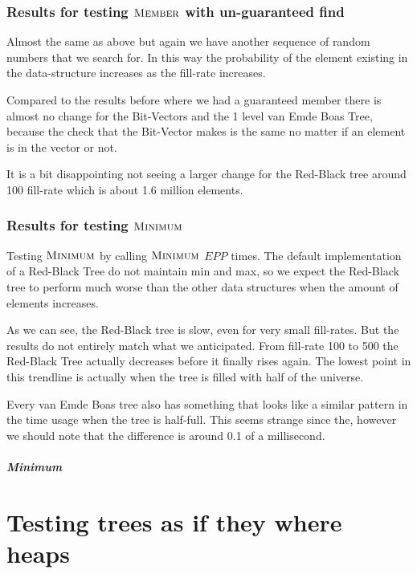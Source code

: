 \documentclass[oneside,11pt,openright]{report}
\newcommand{\Member}{\textsc{Member}}
\newcommand{\Minimum}{\textsc{Minimum}}
\begin{document}
\subsection{Results for testing $\Member$ with un-guaranteed find}

Almost the same as above but again we have another sequence of random numbers that we search for. In this way the probability of the element existing in the data-structure increases as the fill-rate increases.



Compared to the results before where we had a guaranteed member there is almost no change for the Bit-Vectors and the 1 level van Emde Boas Tree, because the check that the Bit-Vector makes is the same no matter if an element is in the vector or not. 

It is a bit disappointing not seeing a larger change for the Red-Black tree around 100 fill-rate which is about 1.6 million elements.

\subsection{Results for testing $\Minimum$}

Testing $\Minimum$ by calling $\Minimum$ $EPP$ times. The default implementation of a Red-Black Tree do not maintain min and max, so we expect the Red-Black tree to perform much worse than the other data structures when the amount of elements increases.



As we can see, the Red-Black tree is slow, even for very small fill-rates. But the results do not entirely match what we anticipated. From fill-rate 100 to 500 the Red-Black Tree actually decreases before it finally rises again. The lowest point in this trendline is actually when the tree is filled with half of the universe.

Every van Emde Boas tree also has something that looks like a similar pattern in the time usage when the tree is half-full. This seems strange since the, however we should note that the difference is around 0.1 of a millisecond.

\paragraph{Minimum} 

\chapter{Testing trees as if they where heaps}
\end{document}
